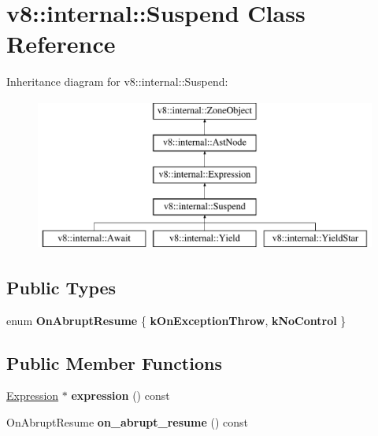 \hypertarget{classv8_1_1internal_1_1Suspend}{}\section{v8\+:\+:internal\+:\+:Suspend Class Reference}
\label{classv8_1_1internal_1_1Suspend}
Inheritance diagram for v8\+:\+:internal\+:\+:Suspend\+:\begin{figure}[H]
\begin{center}
\leavevmode
\includegraphics[height=5.000000cm]{classv8_1_1internal_1_1Suspend}
\end{center}
\end{figure}
\subsection*{Public Types}
\begin{DoxyCompactItemize}
\item 
\mbox{\label{classv8_1_1internal_1_1Suspend_a261148a9fb24b108076d2955bae2eba2}} 
enum {\bfseries On\+Abrupt\+Resume} \{ {\bfseries k\+On\+Exception\+Throw}, 
{\bfseries k\+No\+Control}
 \}
\end{DoxyCompactItemize}
\subsection*{Public Member Functions}
\begin{DoxyCompactItemize}
\item 
\mbox{\label{classv8_1_1internal_1_1Suspend_a47cbf6edcfce4da525704cba894af967}} 
\mbox{\hyperlink{classv8_1_1internal_1_1Expression}{Expression}} $\ast$ {\bfseries expression} () const
\item 
\mbox{\label{classv8_1_1internal_1_1Suspend_a9dc3c9b57e51bec83b8720c97b8ddba4}} 
On\+Abrupt\+Resume {\bfseries on\+\_\+abrupt\+\_\+resume} () const
\end{DoxyCompactItemize}

